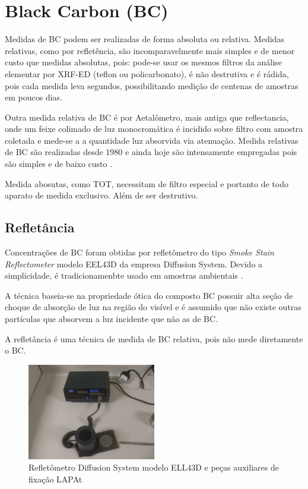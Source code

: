 \section{Black Carbon (BC)}

Medidas de BC podem ser realizadas de forma absoluta ou relativa. 
Medidas relativas, como por refletência, são incomparavelmente mais simples 
e de menor custo que medidas absolutas, pois: pode-se usar os mesmos filtros 
da análise elementar por XRF-ED (teflon ou policarbonato), é não destrutiva e 
é rádida, pois cada medida leva segundos, possibilitando medição de centenas de 
amostras em poucos dias.

Outra medida relativa de BC é por Aetalômetro, mais antiga que reflectancia,
onde um feixe colimado de  luz monocromática é incidido sobre
filtro com amostra coletada e mede-se a a quantidade luz absorvida via 
atenuação. Medida relativas de BC são realizadas desde 1980 e ainda hoje são 
intensamente empregadas pois são simples e de baixo custo \citep{targino2016}.

Medida abosutas, como TOT, necessitam de filtro especial e portanto de 
todo aparato de medida exclusivo. Além de ser destrutivo. 

\subsection{Refletância}

Concentrações de BC foram obtidas por refletômetro do tipo 
\textit{Smoke Stain Reflectometer} modelo EEL43D da empresa Diffusion System.
Devido a simplicidade, é tradicionamenbte usado em amostras ambientais 
\citep{lack2014}. 

A técnica baseia-se na propriedade ótica do composto BC possuir alta seção de choque 
de absorção de luz na região do visível e é assumido que não existe outras 
partículas que absorvem a luz incidente que não as de BC.

A refletância é uma técnica de medida de BC relativa, pois não mede diretamente
o BC. 

\begin{figure}[H]
  \centering
  \includegraphics[width=0.5\textwidth]{../inputs/images/refletometro.jpg}
  \caption{Refletômetro Diffusion System modelo ELL43D 
           e peças auxiliares de fixação LAPAt}
\end{figure}

